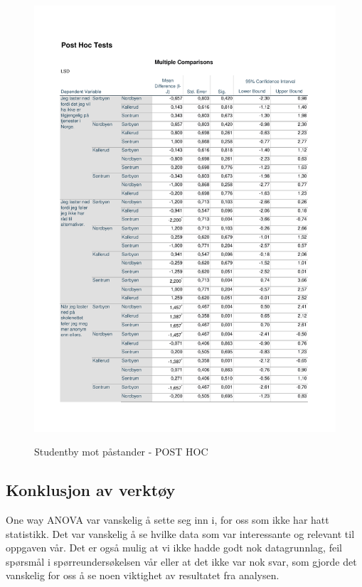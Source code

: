 \begin{figure}[H]
    \centering
    \includegraphics[scale=0.7]{case_1/bilder/POST-HOC_studentby-pastand.pdf}
    \label{fig:POST-HOC_studentby-påstand}
    \caption{Studentby mot påstander - POST HOC}
\end{figure}



\subsection{Konklusjon av verktøy}
One way ANOVA var vanskelig å sette seg inn i, for oss som ikke har hatt statistikk. Det var vanskelig å se hvilke data som var interessante og relevant til oppgaven vår. Det er også mulig at vi ikke hadde godt nok datagrunnlag, feil spørsmål i spørreundersøkelsen vår eller at det ikke var nok svar, som gjorde det vanskelig for oss å se noen viktighet av resultatet fra analysen. 

